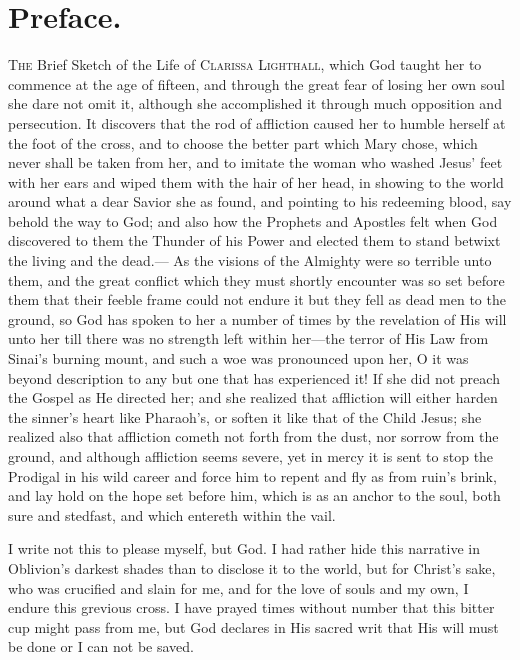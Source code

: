 \documentclass{article}
\begin{document}
\section*{Preface.}
\textsc{The} Brief Sketch of the Life of \textsc{Clarissa Lighthall}, which God taught her to commence at the age of fifteen, and through the great fear of losing her own soul she dare not omit it, although she accomplished it through much opposition and persecution.
It discovers that the rod of affliction caused her to humble herself at the foot of the cross, and to choose the better part which Mary chose, which never shall be taken from her, and to imitate the woman who washed Jesus' feet with her ears and wiped them with the hair of her head, in showing to the world around what a dear Savior she as found, and pointing to his redeeming blood, say behold the way to God; and also how the Prophets and Apostles felt when God discovered to them the Thunder of his Power and elected them to stand betwixt the living and the dead.---
As the visions of the Almighty were so terrible unto them, and the great conflict which they must shortly encounter was so set before them that their feeble frame could not endure it but they fell as dead men to the ground, so God has spoken to her a number of times by the revelation of His will unto her till there was no strength left within her---the terror of His Law from Sinai's burning mount, and such a woe was pronounced upon her, O it was beyond description to any but one that has experienced it!
If she did not preach the Gospel as He directed her; and she realized that affliction will either harden the sinner's heart like Pharaoh's, or soften it like that of the Child Jesus; she realized also that affliction cometh not forth from the dust, nor sorrow from the ground, and although affliction seems severe, yet in mercy it is sent to stop the Prodigal in his wild career and force him to repent and fly as from ruin's brink, and lay hold on the hope set before him, which is as an anchor to the soul, both sure and stedfast, and which entereth within the vail.

I write not this to please myself, but God.
I had rather hide this narrative in Oblivion's darkest shades than to disclose it to the world, but for Christ's sake, who was crucified and slain for me, and for the love of souls and my own, I endure this grevious cross.
I have prayed times without number that this bitter cup might pass from me, but God declares in His sacred writ that His will must be done or I can not be saved.
\end{document}
